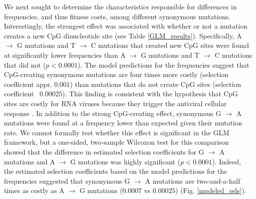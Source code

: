 \documentclass{article}
\begin{document}
We next sought to determine the characteristics responsible for differences in frequencies, and thus fitness costs, among different synonymous mutations. 
Interestingly, the strongest effect was associated with whether or not a mutation creates a new CpG dinucleotide site (see Table \ref{GLM_results}). 
Specifically, A $\rightarrow$ G mutations and T $\rightarrow$ C mutations that created new CpG sites were found at significantly lower frequencies than A $\rightarrow$ G mutations and T $\rightarrow$ C mutations that did not ($p < 0.0001$). The model predictions for the frequencies suggest that CpG-creating synonymous mutations are four times more costly (selection coefficient appr. $0.001$) than mutations that do not create CpG sites (selection coefficient ~$0.00025$). This finding is consistent with the hypothesis that CpG sites are costly for RNA viruses because they trigger the antiviral cellular response \cite{burns2009genetic, atkinson2014influence}. 
In addition to the strong CpG-creating effect, synonymous G $\rightarrow$ A mutations were found at a frequency lower than expected given their mutation rate. We cannot formally test whether this effect is significant in the GLM framework, but a one-sided, two-sample Wilcoxon test for this comparison showed that the difference in estimated selection coefficients for G $\rightarrow$ A mutations and A $\rightarrow$ G mutations %
was highly significant ($p < 0.0001$).
Indeed, the estimated selection coefficients based on the model predictions for the frequencies suggested that synonymous G $\rightarrow$ A mutations are two-and-a-half times as costly as A $\rightarrow$ G mutations ($0.0007$ vs $0.00025$) (Fig. \ref{modeled_sels}). 
\end{document}
